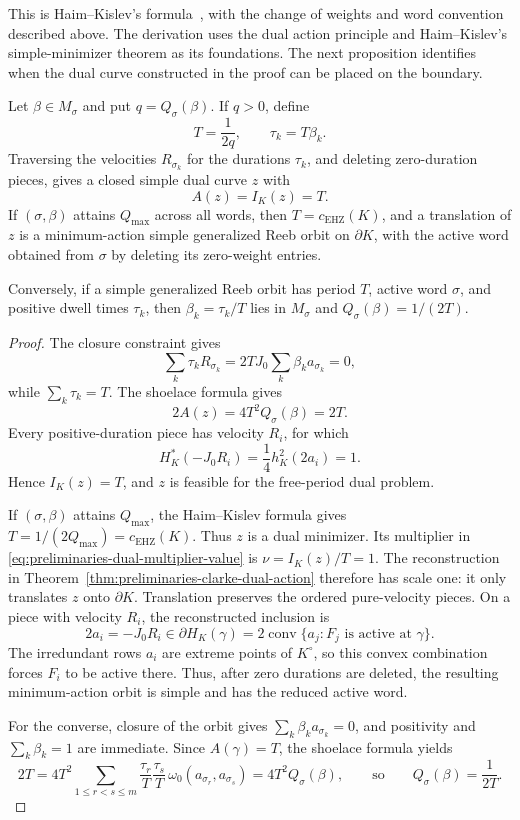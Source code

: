 This is Haim--Kislev's formula~\cite[Theorem~1.1]{HK2017}, with the
change of weights and word convention described above. The derivation uses
the dual action principle and Haim--Kislev's simple-minimizer theorem as its
foundations. The next proposition identifies when the dual curve constructed
in the proof can be placed on the boundary.

\begin{proposition}
\label{prop:quadratic-program-global-maximizer-realization}
Let \(\beta\in M_\sigma\) and put \(q=Q_\sigma(\beta)\).  If \(q>0\), define
\[
  T=\frac{1}{2q},
  \qquad \tau_k=T\beta_k.
\]
Traversing the velocities \(R_{\sigma_k}\) for the durations \(\tau_k\), and
deleting zero-duration pieces, gives a closed simple dual curve \(z\) with
\[
  A(z)=I_K(z)=T.
\]
If \((\sigma,\beta)\) attains \(Q_{\max}\) across all words, then
\(T=c_{\mathrm{EHZ}}(K)\),
and a translation of \(z\) is a minimum-action simple generalized Reeb orbit
on \(\partial K\), with the active word obtained from \(\sigma\) by deleting
its zero-weight entries.

Conversely, if a simple generalized Reeb orbit has period \(T\), active word
\(\sigma\), and positive dwell times \(\tau_k\), then
\(\beta_k=\tau_k/T\) lies in \(M_\sigma\) and
\(Q_\sigma(\beta)=1/(2T)\).
\end{proposition}

\begin{proof}
The closure constraint gives
\[
  \sum_k\tau_kR_{\sigma_k}
  =2T J_0\sum_k\beta_k a_{\sigma_k}
  =0,
\]
while \(\sum_k\tau_k=T\).  The shoelace formula gives
\[
  2A(z)
  =4T^2Q_\sigma(\beta)
  =2T.
\]
Every positive-duration piece has velocity \(R_i\), for which
\[
  H_K^*(-J_0R_i)=\frac14h_K^2(2a_i)=1.
\]
Hence \(I_K(z)=T\), and \(z\) is feasible for the free-period dual problem.

If \((\sigma,\beta)\) attains \(Q_{\max}\), the Haim--Kislev formula gives
\(T=1/(2Q_{\max})=c_{\mathrm{EHZ}}(K)\).  Thus \(z\) is a dual minimizer.
Its multiplier in \eqref{eq:preliminaries-dual-multiplier-value} is
\(\nu=I_K(z)/T=1\).  The reconstruction in
Theorem~\ref{thm:preliminaries-clarke-dual-action} therefore has scale one:
it only translates \(z\) onto \(\partial K\).  Translation preserves the
ordered pure-velocity pieces. On a piece with velocity \(R_i\), the
reconstructed inclusion is
\[
  2a_i=-J_0R_i\in\partial H_K(\gamma)
  =2\operatorname{conv}\{a_j:F_j\text{ is active at }\gamma\}.
\]
The irredundant rows \(a_i\) are extreme points of \(K^\circ\), so this convex
combination forces \(F_i\) to be active there. Thus, after zero durations are
deleted, the resulting minimum-action orbit is simple and has the reduced
active word.

For the converse, closure of the orbit gives
\(\sum_k\beta_k a_{\sigma_k}=0\), and positivity and
\(\sum_k\beta_k=1\) are immediate.  Since \(A(\gamma)=T\), the shoelace
formula yields
\[
  2T
  =
  4T^2
  \sum_{1\leq r<s\leq m}
    \frac{\tau_r}{T}\frac{\tau_s}{T}\,
    \omega_0(a_{\sigma_r},a_{\sigma_s})
  =
  4T^2Q_\sigma(\beta),
  \qquad\text{so}\qquad
  Q_\sigma(\beta)=\frac{1}{2T}.
\]
\end{proof}

